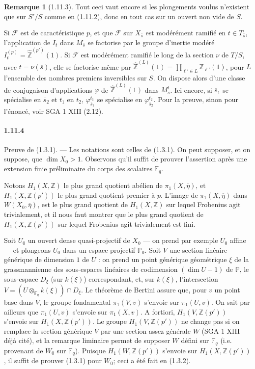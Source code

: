 \documentclass[12pt,a4paper]{article}
\theoremstyle{plain}
\theoremstyle{definition}
\newtheorem{remark}[theorem]{Remarque}
\theoremstyle{remark}
\newcommand{\FF}{{\mathbb{F}}}
\newcommand{\ZZ}{{\mathbb{Z}}}
\newcommand{\ZZhat}{{\widehat{\ZZ}}}
\newcommand{\PP}{{\mathbb{P}}}
\begin{document}
\begin{remark}[1.11.3]
Tout ceci vaut encore si les plongements voulus n'existent que sur $S'/S$ comme en (1.11.2), donc en tout cas sur un ouvert non vide de $S$.

Si $\mathscr{F}$ est de caract\'eristique $p$, et que $\mathscr{F}$ sur $X_{\overline{s}}$ est mod\'er\'ement ramifi\'e en $t \in T_{\overline{s}}$, l'application de $I_t$ dans $M_{\overline{s}}$ se factorise par le groupe d'inertie mod\'er\'e $I_t^{(p)} = \ZZhat^{(p')}(1)$. Si $\mathscr{F}$ est mod\'er\'ement ramifi\'e le long de la section $\nu$ de $T/S$, avec $t = \nu(\overline{s})$, elle se factorise m\^eme par $\ZZhat^{(L)}(1) = \prod_{\ell' \in L} \ZZ_{\ell'}(1)$, pour $L$ l'ensemble des nombres premiers inversibles sur $S$. On dispose alors d'une classe de conjugaison d'applications $\varphi$ de $\ZZhat^{(L)}(1)$ dans $M_{\overline{s}}^t$. Ici encore, si $\overline{s}_1$ se sp\'ecialise en $\overline{s}_2$ et $t_1$ en $t_2$, $\varphi_{\overline{s}_1}^{t_1}$ se sp\'ecialise en $\varphi_{\overline{s}_2}^{t_2}$. Pour la preuve, sinon pour l'\'enonc\'e, voir SGA 1 XIII (2.12).
\end{remark}

\paragraph{1.11.4}
Preuve de (1.3.1). --- Les notations sont celles de (1.3.1). On peut supposer, et on suppose, que $\dim X_0 > 1$. Observons qu'il suffit de prouver l'assertion apr\`es une extension finie pr\'eliminaire du corps des scalaires $\FF_q$.

Notons $H_1(X, \ZZ)$ le plus grand quotient ab\'elien de $\pi_1(X, \overline{\eta})$, et $H_1(X, \ZZ(p'))$ le plus grand quotient premier \`a $p$. L'image de $\pi_1(X, \overline{\eta})$ dans $W(X_0, \overline{\eta})$, est le plus grand quotient de $H_1(X, \ZZ)$ sur lequel Frobenius agit trivialement, et il nous faut montrer que le plus grand quotient de $H_1(X, \ZZ(p'))$ sur lequel Frobenius agit trivialement est fini.

Soit $U_0$ un ouvert dense quasi-projectif de $X_0$ --- on prend par exemple $U_0$ affine --- et plongeons $U_0$ dans un espace projectif $\PP_0$. Soit $V$ une section lin\'eaire g\'en\'erique de dimension $1$ de $U$ : on prend un point g\'en\'erique g\'eom\'etrique $\xi$ de la grassmannienne des sous-espaces lin\'eaires de codimension $(\dim U - 1)$ de $\PP$, le sous-espace $D_\xi$ (sur $k(\xi)$) correspondant, et, sur $k(\xi)$, l'intersection $V = (U \otimes_{\FF_q} k(\xi)) \cap D_\xi$. Le th\'eor\`eme de Bertini assure que, pour $v$ un point base dans $V$, le groupe fondamental $\pi_1(V, v)$ s'envoie sur $\pi_1(U, v)$. On sait par ailleurs que $\pi_1(U, v)$ s'envoie sur $\pi_1(X, v)$. A fortiori, $H_1(V, \ZZ(p'))$ s'envoie sur $H_1(X, \ZZ(p'))$. Le groupe $H_1(V, \ZZ(p'))$ ne change pas si on remplace la section g\'en\'erique $V$ par une section assez g\'en\'erale $W$ (SGA 1 XIII d\'ej\`a cit\'e), et la remarque liminaire permet de supposer $W$ d\'efini sur $\FF_q$ (i.e. provenant de $W_0$ sur $\FF_q$). Puisque $H_1(W, \ZZ(p'))$ s'envoie sur $H_1(X, \ZZ(p'))$, il suffit de prouver (1.3.1) pour $W_0$; ceci a \'et\'e fait en (1.3.2).
\end{document}
